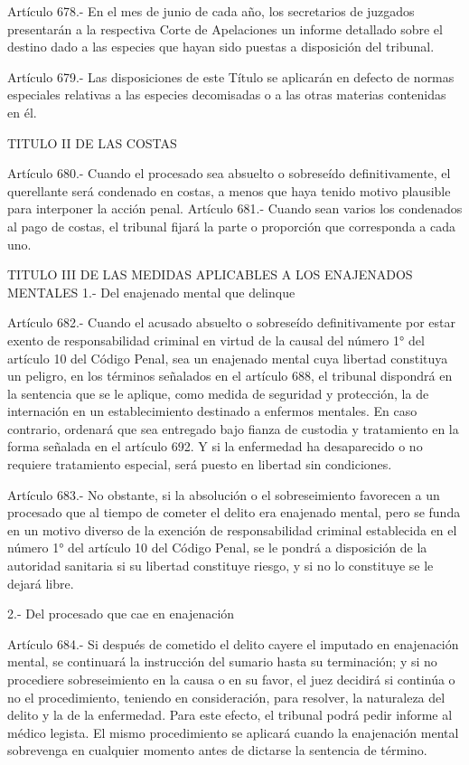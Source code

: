     Artículo 678.- En el mes de junio de cada año, los secretarios de juzgados presentarán a la respectiva Corte de Apelaciones un informe detallado sobre el destino dado a las especies que hayan sido puestas a disposición del tribunal.

    Artículo 679.- Las disposiciones de este Título se aplicarán en defecto de normas especiales relativas a las especies decomisadas o a las otras materias contenidas en él.

  TITULO II
  DE LAS COSTAS


    Artículo 680.- Cuando el procesado sea absuelto o sobreseído definitivamente, el querellante será condenado en costas, a menos que haya tenido motivo plausible para interponer la acción penal.
    Artículo 681.- Cuando sean varios los condenados al pago de costas, el tribunal fijará la parte o proporción que corresponda a cada uno.


        TITULO III
  DE LAS MEDIDAS APLICABLES A LOS ENAJENADOS
        MENTALES
    1.- Del enajenado mental que delinque

    Artículo 682.- Cuando el acusado absuelto o sobreseído definitivamente por estar exento de responsabilidad criminal en virtud de la causal del número 1° del artículo 10 del Código Penal, sea un enajenado mental cuya libertad constituya un peligro, en los términos señalados en el artículo 688, el tribunal dispondrá en la sentencia que se le aplique, como medida de seguridad y protección, la de internación en un establecimiento destinado a enfermos mentales.
    En caso contrario, ordenará que sea entregado bajo fianza de custodia y tratamiento en la forma señalada en el artículo 692.
    Y si la enfermedad ha desaparecido o no requiere tratamiento especial, será puesto en libertad sin condiciones.

    Artículo 683.- No obstante, si la absolución o el sobreseimiento favorecen a un procesado que al tiempo de cometer el delito era enajenado mental, pero se funda en un motivo diverso de la exención de responsabilidad criminal establecida en el número 1° del artículo 10 del Código Penal, se le pondrá a disposición de la autoridad sanitaria si su libertad constituye riesgo, y si no lo constituye se le dejará libre.



  2.- Del procesado que cae en enajenación


    Artículo 684.- Si después de cometido el delito cayere el imputado en enajenación mental, se continuará la instrucción del sumario hasta su terminación; y si no procediere sobreseimiento en la causa o en su favor, el juez decidirá si continúa o no el procedimiento, teniendo en consideración, para resolver, la naturaleza del delito y la de la enfermedad. Para este efecto, el tribunal podrá pedir informe al médico legista.
    El mismo procedimiento se aplicará cuando la enajenación mental sobrevenga en cualquier momento antes de dictarse la sentencia de término.

